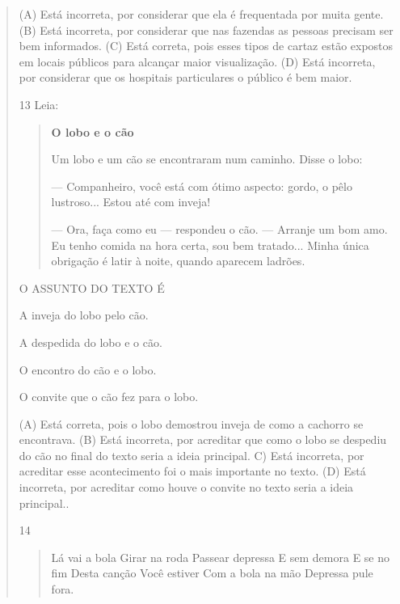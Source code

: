 \begin{verse}
(A) Está incorreta, por considerar que ela é frequentada por muita gente.
(B) Está incorreta, por considerar que nas fazendas as pessoas precisam
ser bem informados.
(C) Está correta, pois esses tipos de cartaz estão expostos em locais
públicos para alcançar maior visualização.
(D) Está incorreta, por considerar que os hospitais particulares o
público é bem maior.

\num{13} Leia:


\begin{quote}
\textbf{O lobo e o cão}

Um lobo e um cão se encontraram num caminho. Disse o lobo:

--- Companheiro, você está com ótimo aspecto: gordo, o pêlo lustroso...
Estou até com inveja!

--- Ora, faça como eu --- respondeu o cão. --- Arranje um bom amo.
Eu tenho comida na hora certa, sou bem tratado...
Minha única obrigação é latir à noite, quando aparecem ladrões.
\end{quote}


O ASSUNTO DO TEXTO É

\begin{escolha}
\item A inveja do lobo pelo cão.

\item A despedida do lobo e o cão.

\item O encontro do cão e o lobo.

\item O convite que o cão fez para o lobo.
\end{escolha}


(A) Está correta, pois o lobo demostrou inveja de como a cachorro se encontrava.
(B) Está incorreta, por acreditar que como o lobo se despediu do cão no
final do texto seria a ideia principal.
C) Está incorreta, por acreditar esse acontecimento foi o mais
importante no texto.
(D) Está incorreta, por acreditar como houve o convite no texto seria a
ideia principal..

\num{14}

\begin{verse}
Lá vai a bola
Girar na roda
Passear depressa
E sem demora
E se no fim
Desta canção
Você estiver
Com a bola na mão
Depressa pule fora.
\end{verse}


\end{verse}
